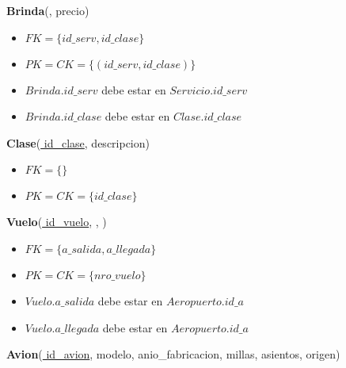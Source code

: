 \vspace*{0.1cm}
\noindent
\textbf{Brinda}(\underline{}, 
	precio)

\begin{itemize}[noitemsep]
	\item $FK = \{id\_serv, id\_clase\}$
	\item $PK = CK = \{(id\_serv, id\_clase)\}$
	\item $Brinda.id\_serv$ debe estar en $Servicio.id\_serv$
	\item $Brinda.id\_clase$ debe estar en $Clase.id\_clase$
\end{itemize}


\vspace*{0.1cm}
\noindent
\textbf{Clase}(\underline{
	id\_clase}, 
	descripcion)

\begin{itemize}[noitemsep]
	\item $FK = \{\}$
	\item $PK = CK = \{id\_clase\}$
\end{itemize}


\newpage
\vspace*{0.1cm}
\noindent
\textbf{Vuelo}(\underline{
	id\_vuelo}, , )

\begin{itemize}[noitemsep]
	\item $FK = \{a\_salida, a\_llegada\}$
	\item $PK = CK = \{nro\_vuelo\}$
	\item $Vuelo.a\_salida$ debe estar en $Aeropuerto.id\_a$
	\item $Vuelo.a\_llegada$ debe estar en $Aeropuerto.id\_a$
\end{itemize}


\vspace*{0.1cm}
\noindent
\textbf{Avion}(\underline{
	id\_avion}, 
	modelo, 
	anio\_fabricacion, 
    millas, 
    asientos, 
    origen)

